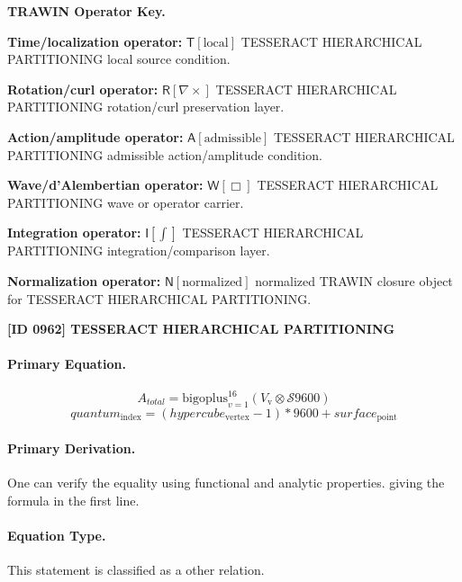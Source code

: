 \par\vspace{0.45\baselineskip}
\noindent\begin{minipage}[t]{\linewidth}
\begingroup
\small
\raggedright
\textbf{TRAWIN Operator Key.}\par
\noindent\textbf{Time/localization operator:} $\mathsf{T}\!\left[\mathrm{local}\right]$ TESSERACT HIERARCHICAL PARTITIONING local source condition.\par
\noindent\textbf{Rotation/curl operator:} $\mathsf{R}\!\left[\nabla\times\right]$ TESSERACT HIERARCHICAL PARTITIONING rotation/curl preservation layer.\par
\noindent\textbf{Action/amplitude operator:} $\mathsf{A}\!\left[\mathrm{admissible}\right]$ TESSERACT HIERARCHICAL PARTITIONING admissible action/amplitude condition.\par
\noindent\textbf{Wave/d'Alembertian operator:} $\mathsf{W}\!\left[\Box\right]$ TESSERACT HIERARCHICAL PARTITIONING wave or operator carrier.\par
\noindent\textbf{Integration operator:} $\mathsf{I}\!\left[\int\right]$ TESSERACT HIERARCHICAL PARTITIONING integration/comparison layer.\par
\noindent\textbf{Normalization operator:} $\mathsf{N}\!\left[\mathrm{normalized}\right]$ normalized TRAWIN closure object for TESSERACT HIERARCHICAL PARTITIONING.\par
\endgroup
\end{minipage}

\clearpage
\noindent\textbf{[ID 0962] TESSERACT HIERARCHICAL PARTITIONING}\par
\vspace{0.35em}
\paragraph{Primary Equation.}
\[
A_{total} = \mathrm{bigoplus}_{v=1}^{16} (V_{\mathrm{v}} \otimes \mathcal{S} {9600})
\]
\[
quantum_{\mathrm{index}} = (hypercube_{\mathrm{vertex}} - 1) * 9600 + surface_{\mathrm{point}}
\]

\paragraph{Primary Derivation.}
One can verify the equality using functional and analytic properties. giving the formula in the first line.
\paragraph{Equation Type.}
This statement is classified as a other relation.

